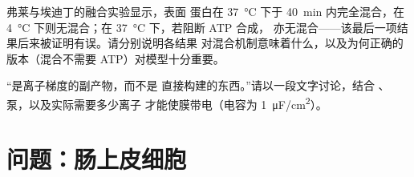 \begin{exercise}[$\star\star\star$]\label{exo:b1:membranes-transport:11}
弗莱与埃迪丁的融合实验显示，表面
蛋白在 \qty{37}{\celsius} 下于 \qty{40}{min} 内完全混合，在
\qty{4}{\celsius} 下则无混合；在 \qty{37}{\celsius} 下，若阻断 ATP 合成，
亦无混合——该最后一项结果后来被证明有误。请分别说明各结果
对混合机制意味着什么，以及为何正确的
版本（混合不需要 ATP）对模型十分重要。
\end{exercise}

\begin{exercise}[$\star\star\star$]\label{exo:b1:membranes-transport:12}
“是离子梯度的副产物，而不是
直接构建的东西。”请以一段文字讨论，结合
、泵，以及实际需要多少离子
才能使膜带电（电容为 \qty{1}{\micro F/cm^2}）。
\end{exercise}

\section{问题：肠上皮细胞}

